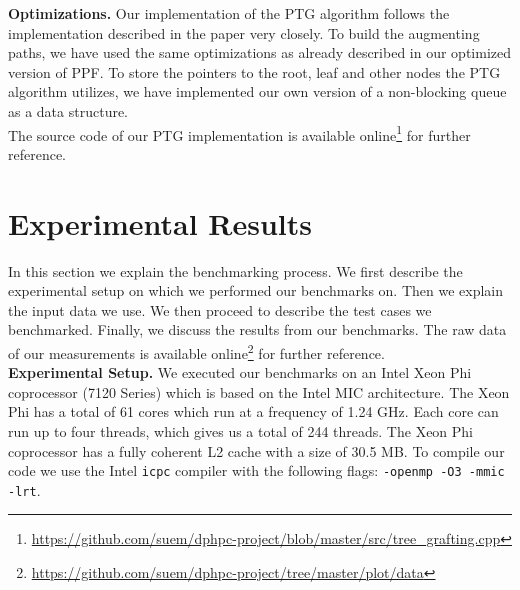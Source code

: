 \documentclass[letterpaper]{article}
\newcommand{\mypar}[1]{{\bf #1.}}
\begin{document}
\mypar{Optimizations}
Our implementation of the PTG algorithm follows the implementation described in the paper very closely. To build the augmenting paths, we have used the same optimizations as already described in our optimized version of PPF. To store the pointers to the root, leaf and other nodes the PTG algorithm utilizes, we have implemented our own version of a non-blocking queue as a data structure. \\

The source code of our PTG implementation is available online\footnote{\url{https://github.com/suem/dphpc-project/blob/master/src/tree_grafting.cpp}} for further reference.


\section{Experimental Results}\label{sec:exp}

In this section we explain the benchmarking process. We first describe the experimental setup on which we performed our benchmarks on. 
Then we explain the input data we use. We then proceed to describe the test cases we benchmarked. Finally, we discuss the results from our benchmarks.
The raw data of our measurements is available online\footnote{\url{https://github.com/suem/dphpc-project/tree/master/plot/data}} for further reference.\\

\mypar{Experimental Setup} 
We executed our benchmarks on an Intel Xeon Phi coprocessor (7120 Series) which is based on the Intel MIC architecture. The Xeon Phi has a total of 61 cores which run at a frequency of 1.24 GHz. Each core can run up to four threads, which gives us a total of 244 threads. The Xeon Phi coprocessor has a fully coherent L2 cache with a size of 30.5 MB. To compile our code we use the Intel \texttt{icpc} compiler with the following flags: \texttt{-openmp -O3 -mmic -lrt}.\\
\end{document}
